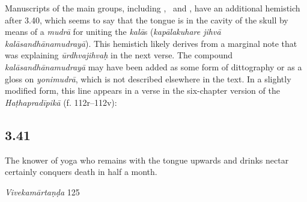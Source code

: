 \begin{ekdosis}
\begin{philcomm}[hp03_040]
Manuscripts of the main groups, including \textalpha, \textbeta\ and \textgamma, have an additional hemistich after 3.40, which seems to say that the tongue is in the cavity of the skull by means of a \emph{mudrā} for uniting the \emph{kalā}s (\emph{kapālakuhare jihvā kalāsandhānamudrayā}). This hemistich likely derives from a marginal note that was explaining \emph{ūrdhvajihvaḥ} in the next verse. The compound \emph{kalāsandhānamudrayā} may have been added as some form of dittography or as a gloss on \emph{yonimudrā}, which is not described elsewhere in the text. In a slightly modified form, this line appears in a verse in the six-chapter version of the \emph{Haṭhapradīpikā} (f. 112r–112v):

\begin{versinnote}
\end{versinnote}


\end{philcomm}

\subsection*{3.41}
\begin{translation}[hp03_041]
The knower of yoga who remains with the tongue upwards and drinks nectar certainly conquers death in half a month.
\end{translation}

\begin{sources}[hp03_041]
\emph{Vivekamārtaṇḍa} 125
\begin{versinnote}
\tl{\var{ūrdhvajihvaḥ sthito bhūtvā ] ūrdhvajihvas tato bhūtvā, ūrdhvaṃ jihvāṃ sthiraṃ kṛtvā, ūrdhvāṃ jihvā sthirāṃ kṛtvā \vl}\\!}
\end{versinnote}
\end{sources}


\end{ekdosis}
